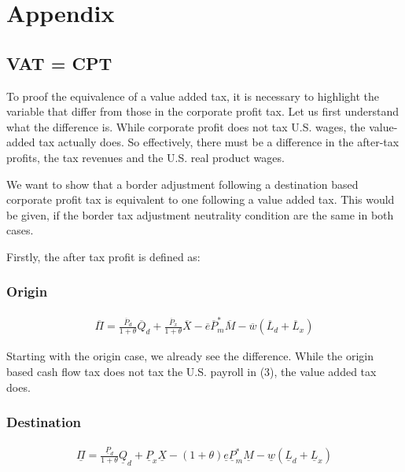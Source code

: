 \section{Appendix}

\subsection{VAT = CPT}
To proof the equivalence of a value added tax, it is necessary to highlight the variable that differ from those in the corporate profit tax. Let us first understand what the difference is. While corporate profit does not tax U.S. wages, the value-added tax actually does. So effectively, there must be a difference in the after-tax profits, the tax revenues and the U.S. real product wages. 

We want to show that a border adjustment following a destination based corporate profit tax is equivalent to one following a value added tax. This would be given, if the border tax adjustment neutrality condition are the same in both cases. 

Firstly, the after tax profit is defined as: 

\subsubsection*{Origin}
\begin{equation}
\begin{aligned}
\overline \Pi = \frac{\overline P_d}{1+\theta}\overline Q_d + \frac{\overline P_x}{1+\theta}\overline X - \overline e \overline P^*_m \overline M - \overline w  \left( \overline L_d + \overline L_x \right)  
\end{aligned}
\end{equation}

Starting with the origin case, we already see the difference.  While the origin based cash flow tax does not tax the U.S. payroll in (3), the value added tax does.

\subsubsection*{Destination}
\begin{equation}
\begin{aligned}
\underline \Pi = \frac{\underline P_d}{1+\theta}\underline Q_d +\underline P_x\underline X -  \left( 1+\theta \right) \underline e \underline P^*_m \underline M - \underline w  \left( \underline L_d + \underline L_x \right) 
\end{aligned}
\end{equation}

